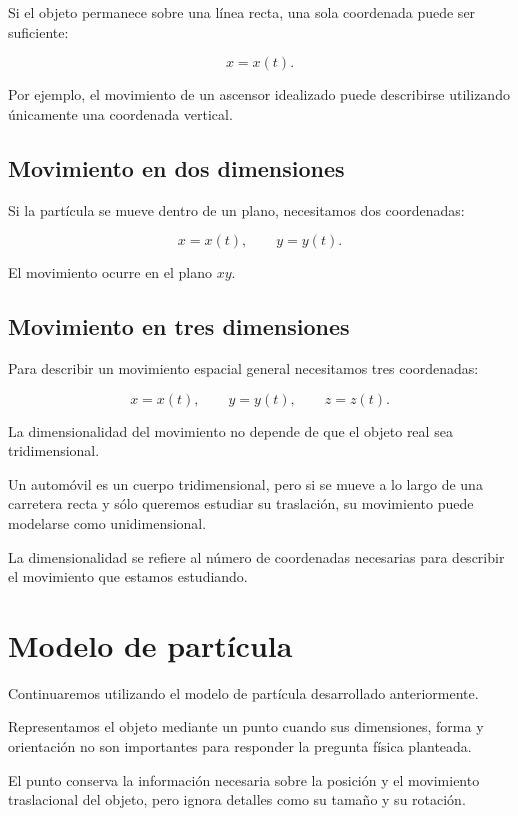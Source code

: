 Si el objeto permanece sobre una línea recta, una sola coordenada puede ser
suficiente:

\[
x=x(t).
\]

Por ejemplo, el movimiento de un ascensor idealizado puede describirse utilizando
únicamente una coordenada vertical.

\subsection{Movimiento en dos dimensiones}

Si la partícula se mueve dentro de un plano, necesitamos dos coordenadas:

\[
x=x(t),
\qquad
y=y(t).
\]

El movimiento ocurre en el plano \(xy\).

\subsection{Movimiento en tres dimensiones}

Para describir un movimiento espacial general necesitamos tres coordenadas:

\[
x=x(t),
\qquad
y=y(t),
\qquad
z=z(t).
\]

\begin{interpretacion}
La dimensionalidad del movimiento no depende de que el objeto real sea
tridimensional.

Un automóvil es un cuerpo tridimensional, pero si se mueve a lo largo de una
carretera recta y sólo queremos estudiar su traslación, su movimiento puede
modelarse como unidimensional.

La dimensionalidad se refiere al número de coordenadas necesarias para describir
el movimiento que estamos estudiando.
\end{interpretacion}


\section{Modelo de partícula}

Continuaremos utilizando el modelo de partícula desarrollado anteriormente.

\begin{modelo}[Partícula]
Representamos el objeto mediante un punto cuando sus dimensiones, forma y
orientación no son importantes para responder la pregunta física planteada.

El punto conserva la información necesaria sobre la posición y el movimiento
traslacional del objeto, pero ignora detalles como su tamaño y su rotación.
\end{modelo}

